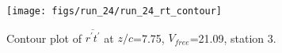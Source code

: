 \begin{figure}[H]
\centering
\texttt{[image: figs/run\_24/run\_24\_rt\_contour]}
\caption{Contour plot of $\overline{r^\prime t^\prime}$ at $z/c$=7.75, $V_{free}$=21.09, station 3.}
\label{fig:run_24_rt_contour}
\end{figure}


